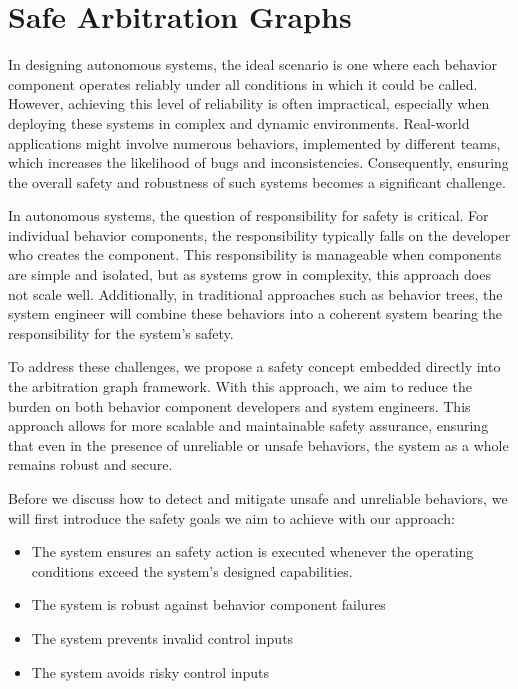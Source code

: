 \section{Safe Arbitration Graphs}

In designing autonomous systems, the ideal scenario is one where each behavior component operates reliably under all conditions in which it could be called.
However, achieving this level of reliability is often impractical, especially when deploying these systems in complex and dynamic environments.
Real-world applications might involve numerous behaviors, implemented by different teams, which increases the likelihood of bugs and inconsistencies.
Consequently, ensuring the overall safety and robustness of such systems becomes a significant challenge.

In autonomous systems, the question of responsibility for safety is critical.
For individual behavior components, the responsibility typically falls on the developer who creates the component.
This responsibility is manageable when components are simple and isolated, but as systems grow in complexity, this approach does not scale well.
Additionally, in traditional approaches such as behavior trees, the system engineer will combine these behaviors into a coherent system bearing the responsibility for the system's safety.

To address these challenges, we propose a safety concept embedded directly into the arbitration graph framework.
With this approach, we aim to reduce the burden on both behavior component developers and system engineers.
This approach allows for more scalable and maintainable safety assurance, ensuring that even in the presence of unreliable or unsafe behaviors, the system as a whole remains robust and secure.

Before we discuss how to detect and mitigate unsafe and unreliable behaviors, we will first introduce the safety goals we aim to achieve with our approach:

\begin{itemize}
    \item The system ensures an safety action is executed whenever the operating conditions exceed the system's designed capabilities.
    \item The system is robust against behavior component failures
    \item The system prevents invalid control inputs
    \item The system avoids risky control inputs
\end{itemize}

